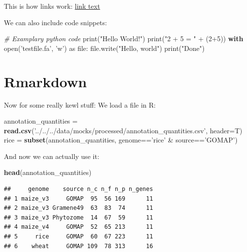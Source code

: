 \documentclass[utf8]{frontiersSCNS} %
\newenvironment{Shaded}{\begin{snugshade}}{\end{snugshade}}
\newcommand{\KeywordTok}[1]{\textcolor[rgb]{0.13,0.29,0.53}{\textbf{{#1}}}}
\newcommand{\DataTypeTok}[1]{\textcolor[rgb]{0.13,0.29,0.53}{{#1}}}
\newcommand{\DecValTok}[1]{\textcolor[rgb]{0.00,0.00,0.81}{{#1}}}
\newcommand{\CharTok}[1]{\textcolor[rgb]{0.31,0.60,0.02}{{#1}}}
\newcommand{\StringTok}[1]{\textcolor[rgb]{0.31,0.60,0.02}{{#1}}}
\newcommand{\CommentTok}[1]{\textcolor[rgb]{0.56,0.35,0.01}{\textit{{#1}}}}
\newcommand{\NormalTok}[1]{{#1}}
\begin{document}
This is how links work: \href{https://example.com/}{link text}

We can also include code snippets:

\begin{Shaded}
\begin{Highlighting}[]
\CommentTok{# Examplary python code}
\DataTypeTok{print}\NormalTok{(}\StringTok{"Hello World!"}\NormalTok{)}
\DataTypeTok{print}\NormalTok{(}\StringTok{"2 + 5 = "} \NormalTok{+ (}\DecValTok{2+5}\NormalTok{))}
\KeywordTok{with} \DataTypeTok{open}\NormalTok{(}\StringTok{'testfile.fa'}\NormalTok{, }\StringTok{'w'}\NormalTok{) }\CharTok{as} \DataTypeTok{file}\NormalTok{:}
  \DataTypeTok{file}\NormalTok{.write(}\StringTok{"Hello, world"}\NormalTok{)}
\DataTypeTok{print}\NormalTok{(}\StringTok{"Done"}\NormalTok{)}
\end{Highlighting}
\end{Shaded}

\section{Rmarkdown}\label{rmarkdown}

Now for some really kewl stuff: We load a file in R:

\begin{Shaded}
\begin{Highlighting}[]
\NormalTok{annotation_quantities =}\StringTok{ }
\StringTok{  }\KeywordTok{read.csv}\NormalTok{(}\StringTok{'../../../data/mocks/processed/annotation_quantities.csv'}\NormalTok{, }\DataTypeTok{header=}\NormalTok{T)}
\NormalTok{rice =}\StringTok{ }\KeywordTok{subset}\NormalTok{(annotation_quantities, genome==}\StringTok{'rice'} \NormalTok{&}\StringTok{ }\NormalTok{source==}\StringTok{'GOMAP'}\NormalTok{)}
\end{Highlighting}
\end{Shaded}

And now we can actually use it:

\begin{Shaded}
\begin{Highlighting}[]
\KeywordTok{head}\NormalTok{(annotation_quantities)}
\end{Highlighting}
\end{Shaded}

\begin{verbatim}
##     genome    source n_c n_f n_p n_genes
## 1 maize_v3     GOMAP  95  56 169      11
## 2 maize_v3 Gramene49  63  83  74      11
## 3 maize_v3 Phytozome  14  67  59      11
## 4 maize_v4     GOMAP  52  65 213      11
## 5     rice     GOMAP  60  67 223      11
## 6    wheat     GOMAP 109  78 313      16
\end{verbatim}
\end{document}
